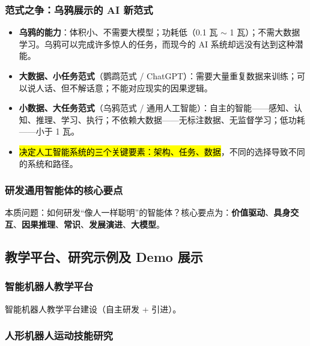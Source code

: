 \subsubsection{范式之争：乌鸦展示的 AI 新范式}

\begin{itemize}[itemsep=2pt]
    \item \textbf{乌鸦的能力}：体积小、不需要大模型；功耗低（0.1 瓦 $\sim$ 1 瓦）；不需大数据学习。乌鸦可以完成许多惊人的任务，而现今的 AI 系统却远没有达到这种潜能。
    \item \textbf{大数据、小任务范式}（鹦鹉范式 / ChatGPT）：需要大量重复数据来训练；可以说人话、但不解话意；不能对应现实的因果逻辑。
    \item \textbf{小数据、大任务范式}（乌鸦范式 / 通用人工智能）：自主的智能——感知、认知、推理、学习、执行；不依赖大数据——无标注数据、无监督学习；低功耗——小于 1 瓦。
    \item \hl{决定人工智能系统的三个关键要素：架构、任务、数据}，不同的选择导致不同的系统和路径。
\end{itemize}

\subsubsection{研发通用智能体的核心要点}

本质问题：如何研发“像人一样聪明”的智能体？核心要点为：\textbf{价值驱动}、\textbf{具身交互}、\textbf{因果推理}、\textbf{常识}、\textbf{发展演进}、\textbf{大模型}。

\subsection{教学平台、研究示例及 Demo 展示}

\subsubsection{智能机器人教学平台}

智能机器人教学平台建设（自主研发 + 引进）。

\subsubsection{人形机器人运动技能研究}

